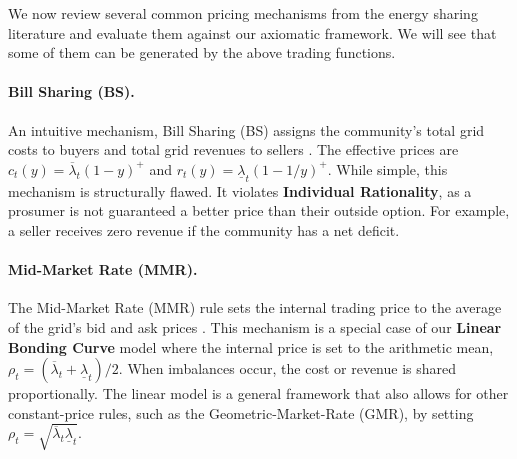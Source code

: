 \documentclass[12pt, notitlepage]{article}
\begin{document}
We now review several common pricing mechanisms from the energy sharing literature and evaluate them against our axiomatic framework. We will see that some of them can be generated by the above trading functions. 

\paragraph{Bill Sharing (BS).}
An intuitive mechanism, Bill Sharing (BS) assigns the community's total grid costs to buyers and total grid revenues to sellers \cite{XIONG2022300}. The effective prices are $c_t(y) = \overline{\lambda}_t (1 - y)^+$ and $r_t(y) =\underline{\lambda}_t (1 - 1/y)^+$. While simple, this mechanism is structurally flawed. It violates \textbf{Individual Rationality}, as a prosumer is not guaranteed a better price than their outside option. For example, a seller receives zero revenue if the community has a net deficit.

\paragraph{Mid-Market Rate (MMR).}
The Mid-Market Rate (MMR) rule sets the internal trading price to the average of the grid's bid and ask prices \cite{muntasir2023developing}. This mechanism is a special case of our \textbf{Linear Bonding Curve} model where the internal price is set to the arithmetic mean, $\rho_t = (\overline{\lambda}_t + \underline{\lambda}_t)/2$. When imbalances occur, the cost or revenue is shared proportionally. The linear model is a general framework that also allows for other constant-price rules, such as the Geometric-Market-Rate (GMR), by setting $\rho_t  = \sqrt{\overline{\lambda}_t \underline{\lambda}_t}$.
\end{document}
